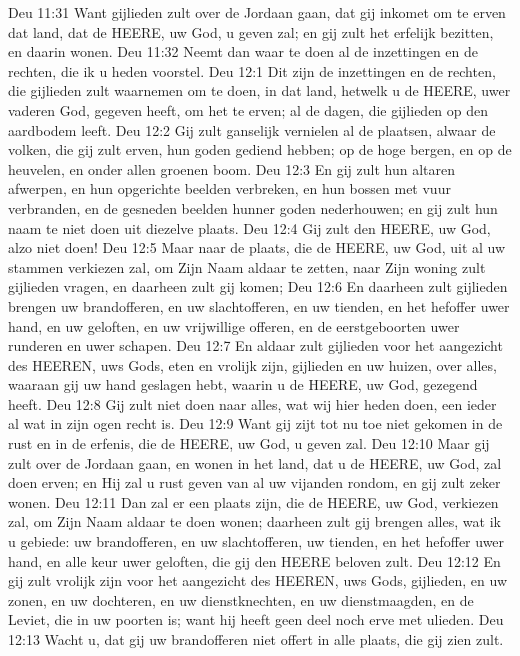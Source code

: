 Deu 11:31  Want gijlieden zult over de Jordaan gaan, dat gij inkomet om te erven dat land, dat de HEERE, uw God, u geven zal; en gij zult het erfelijk bezitten, en daarin wonen.
Deu 11:32  Neemt dan waar te doen al de inzettingen en de rechten, die ik u heden voorstel.
Deu 12:1  Dit zijn de inzettingen en de rechten, die gijlieden zult waarnemen om te doen, in dat land, hetwelk u de HEERE, uwer vaderen God, gegeven heeft, om het te erven; al de dagen, die gijlieden op den aardbodem leeft.
Deu 12:2  Gij zult ganselijk vernielen al de plaatsen, alwaar de volken, die gij zult erven, hun goden gediend hebben; op de hoge bergen, en op de heuvelen, en onder allen groenen boom.
Deu 12:3  En gij zult hun altaren afwerpen, en hun opgerichte beelden verbreken, en hun bossen met vuur verbranden, en de gesneden beelden hunner goden nederhouwen; en gij zult hun naam te niet doen uit diezelve plaats.
Deu 12:4  Gij zult den HEERE, uw God, alzo niet doen!
Deu 12:5  Maar naar de plaats, die de HEERE, uw God, uit al uw stammen verkiezen zal, om Zijn Naam aldaar te zetten, naar Zijn woning zult gijlieden vragen, en daarheen zult gij komen;
Deu 12:6  En daarheen zult gijlieden brengen uw brandofferen, en uw slachtofferen, en uw tienden, en het hefoffer uwer hand, en uw geloften, en uw vrijwillige offeren, en de eerstgeboorten uwer runderen en uwer schapen.
Deu 12:7  En aldaar zult gijlieden voor het aangezicht des HEEREN, uws Gods, eten en vrolijk zijn, gijlieden en uw huizen, over alles, waaraan gij uw hand geslagen hebt, waarin u de HEERE, uw God, gezegend heeft.
Deu 12:8  Gij zult niet doen naar alles, wat wij hier heden doen, een ieder al wat in zijn ogen recht is.
Deu 12:9  Want gij zijt tot nu toe niet gekomen in de rust en in de erfenis, die de HEERE, uw God, u geven zal.
Deu 12:10  Maar gij zult over de Jordaan gaan, en wonen in het land, dat u de HEERE, uw God, zal doen erven; en Hij zal u rust geven van al uw vijanden rondom, en gij zult zeker wonen.
Deu 12:11  Dan zal er een plaats zijn, die de HEERE, uw God, verkiezen zal, om Zijn Naam aldaar te doen wonen; daarheen zult gij brengen alles, wat ik u gebiede: uw brandofferen, en uw slachtofferen, uw tienden, en het hefoffer uwer hand, en alle keur uwer geloften, die gij den HEERE beloven zult.
Deu 12:12  En gij zult vrolijk zijn voor het aangezicht des HEEREN, uws Gods, gijlieden, en uw zonen, en uw dochteren, en uw dienstknechten, en uw dienstmaagden, en de Leviet, die in uw poorten is; want hij heeft geen deel noch erve met ulieden.
Deu 12:13  Wacht u, dat gij uw brandofferen niet offert in alle plaats, die gij zien zult.
